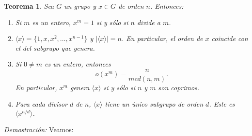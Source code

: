 \documentclass[12pt]{article}
\newtheorem{theorem}{Teorema}[section]
\begin{document}
\begin{theorem}\label{eq:prelgrupcic}
Sea $G$ un grupo y $x \in G$ de orden $n$. Entonces:
\begin{enumerate}
\item Si $m$ es un entero, $x^m =1$ si y sólo si $n$ divide a $m$.
\item $\langle x \rangle = \lbrace 1, x, x^2, \ldots, x^{n-1} \rbrace$ y $|\langle x \rangle | = n$. En particular, el orden de $x$ coincide con el del subgrupo que genera.
\item Si $0\neq m$ es un entero, entonces $$o(x^m)= \dfrac{n}{mcd(n,m)}.$$ En particular, $x^m$ genera $\langle x \rangle$ si y sólo si $n$ y $m$ son coprimos.
\item Para cada divisor $d$ de $n$, $\langle x \rangle$ tiene un único subgrupo de orden $d$. Este es $\langle x^{n/d} \rangle$.
\end{enumerate}
\end{theorem}
\emph{Demostración: }Veamos:
\end{document}
